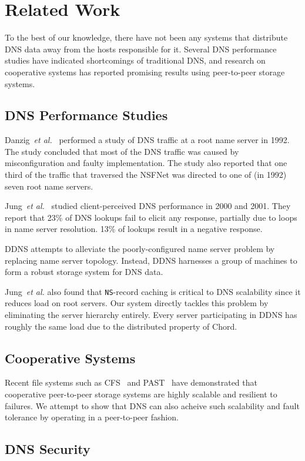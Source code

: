 \section{Related Work}

To the best of our knowledge, there have not
been any systems that distribute DNS data away
from the hosts responsible for it.
Several DNS performance
studies have indicated shortcomings 
of traditional DNS, and research on cooperative 
systems has reported promising results using 
peer-to-peer storage systems.
 
\subsection{DNS Performance Studies}

Danzig~{\it et al.}~\cite{dnsroot:sigcomm92} performed 
a study of DNS traffic at a root name server in 
1992. The study concluded that most of the DNS traffic 
was caused by misconfiguration and faulty implementation.
The study also reported that one third of the traffic 
that traversed the NSFNet was directed to one of (in 1992)
seven root name servers. 

Jung~{\it et al.}~\cite{dnscache:sigcommimw01} studied 
client-perceived DNS performance in 2000 and 2001.
They report that 23\% of DNS lookups fail to elicit
any response, partially due to loops in name server resolution.
13\% of lookups result in a negative response.

DDNS attempts to alleviate the poorly-configured
name server problem by replacing name server topology.
Instead, DDNS harnesses a group of machines
to form a robust storage system for DNS data.

Jung~{\it et al.} also found that {\tt NS}-record caching
is critical to DNS scalability since it reduces load on 
root servers. Our system directly tackles this problem by 
eliminating the server hierarchy entirely.
Every server participating in DDNS has roughly
the same load due to the distributed property of Chord.

\subsection{Cooperative Systems}

Recent file systems such as CFS~\cite{cfs:sosp01} and 
PAST~\cite{past:sosp} have demonstrated that cooperative 
peer-to-peer storage systems 
are highly scalable and resilient to failures. We attempt
to show that DNS can also acheive such scalability 
and fault tolerance by operating in a peer-to-peer fashion.


\subsection{DNS Security}
